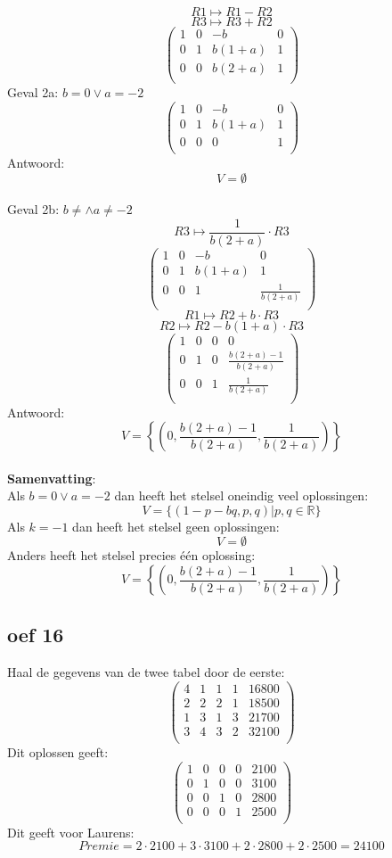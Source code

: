 \documentclass[10pt,a4paper]{article}
\begin{document}
\[ R1 \longmapsto R1 - R2 \]
\[ R3 \longmapsto R3 + R2 \]
\[
\begin{pmatrix}
1 & 0 & -b & 0\\
0 & 1 & b(1+a) & 1\\
0 & 0 & b(2+a) & 1\\
\end{pmatrix}
\]
Geval 2a: $b=0 \vee a=-2$
\[
\begin{pmatrix}
1 & 0 & -b & 0\\
0 & 1 & b(1+a) & 1\\
0 & 0 & 0 & 1\\
\end{pmatrix}
\]
Antwoord:
\[
V=\emptyset
\]\\
Geval 2b: $b\neq \wedge a \neq -2$
\[ R3 \longmapsto \frac{1}{b(2+a)}\cdot R3 \]
\[
\begin{pmatrix}
1 & 0 & -b & 0\\
0 & 1 & b(1+a) & 1\\
0 & 0 & 1 & \frac{1}{b(2+a)}\\
\end{pmatrix}
\]
\[ R1 \longmapsto R2 + b\cdot R3 \]
\[ R2 \longmapsto R2 - b(1+a)\cdot R3 \]
\[
\begin{pmatrix}
1 & 0 & 0 & 0\\
0 & 1 & 0 & \frac{b(2+a)-1}{b(2+a)}\\
0 & 0 & 1 & \frac{1}{b(2+a)}\\
\end{pmatrix}
\]
Antwoord:
\[
V=\left\lbrace\left(0,\frac{b(2+a)-1}{b(2+a)}, \frac{1}{b(2+a)}\right)\right\rbrace
\]\\
\textbf{Samenvatting}:\\
Als  $b=0 \vee a=-2$ dan heeft het stelsel oneindig veel oplossingen:
\[
V = \{ (1-p-bq,p,q) | p,q \in \mathbb{R} \}
\]
Als $k=-1$ dan heeft het stelsel geen oplossingen:
\[
V=\emptyset
\]
Anders heeft het stelsel precies één oplossing:
\[
V=\left\lbrace\left(0,\frac{b(2+a)-1}{b(2+a)}, \frac{1}{b(2+a)}\right)\right\rbrace
\]
\subsection*{oef 16}
Haal de gegevens van de twee tabel door de eerste:
\[
\begin{pmatrix}
4 & 1 & 1 & 1 & 16800\\
2 & 2 & 2 & 1 & 18500\\
1 & 3 & 1 & 3 & 21700\\
3 & 4 & 3 & 2 & 32100\\
\end{pmatrix}
\]
Dit oplossen geeft:
\[
\begin{pmatrix}
1 & 0 & 0 & 0 & 2100\\
0 & 1 & 0 & 0 & 3100\\
0 & 0 & 1 & 0 & 2800\\
0 & 0 & 0 & 1 & 2500\\
\end{pmatrix}
\]
Dit geeft voor Laurens:
\[
Premie = 2\cdot 2100 + 3\cdot 3100 + 2\cdot 2800 + 2\cdot 2500 = 24100
\]
\end{document}
